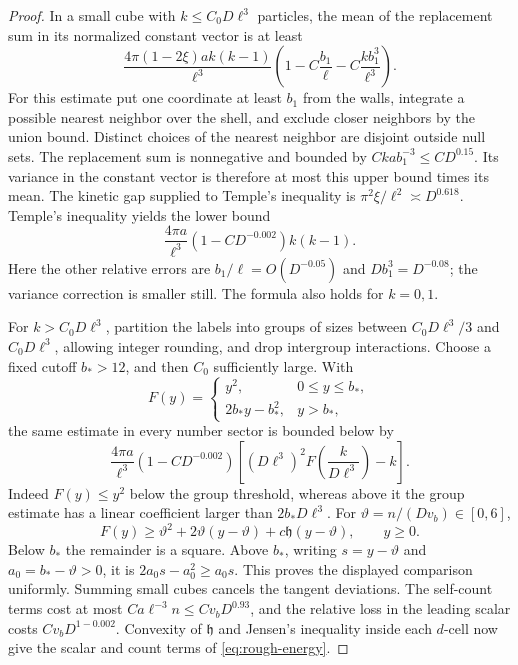 \begin{proof}
In a small cube with $k\le C_0D\ell^3$ particles, the mean of the
replacement sum in its normalized constant vector is at least
\[
 \frac{4\pi(1-2\xi)ak(k-1)}{\ell^3}
       \left(1-C\frac{b_1}{\ell}-C\frac{kb_1^3}{\ell^3}\right).
\]
For this estimate put one coordinate at least $b_1$ from the walls,
integrate a possible nearest neighbor over the shell, and exclude closer
neighbors by the union bound.  Distinct choices of the nearest neighbor
are disjoint outside null sets.  The replacement sum is nonnegative
and bounded by $Ckab_1^{-3}\le CD^{0.15}$.  Its variance in the constant
vector is therefore at most this upper bound times its mean.  The
kinetic gap supplied to Temple's inequality is
$\pi^2\xi/\ell^2\asymp D^{0.618}$.
Temple's inequality yields the lower bound
\[
 \frac{4\pi a}{\ell^3}(1-CD^{-0.002})k(k-1).
\]
Here the other relative errors are
$b_1/\ell=O(D^{-0.05})$ and $Db_1^3=D^{-0.08}$; the variance correction
is smaller still.  The formula also holds for $k=0,1$.

For $k>C_0D\ell^3$, partition the labels into groups of sizes between
$C_0D\ell^3/3$ and $C_0D\ell^3$, allowing integer rounding, and drop
intergroup interactions.  Choose a fixed cutoff $b_*>12$, and then $C_0$
sufficiently large.  With
\[
 F(y)=\begin{cases}y^2,&0\le y\le b_*,\\2b_*y-b_*^2,&y>b_*,\end{cases}
\]
the same estimate in every number sector is bounded below by
\[
 \frac{4\pi a}{\ell^3}(1-CD^{-0.002})
       \left[(D\ell^3)^2F\left(\frac{k}{D\ell^3}\right)-k\right].
\]
Indeed $F(y)\le y^2$ below the group threshold, whereas above it the
group estimate has a linear coefficient larger than $2b_*D\ell^3$.
For $\vartheta=n/(Dv_b)\in[0,6]$,
\[
 F(y)\ge\vartheta^2+2\vartheta(y-\vartheta)
                         +c\mathfrak h(y-\vartheta),\qquad y\ge0.
\]
Below $b_*$ the remainder is a square.  Above $b_*$, writing
$s=y-\vartheta$ and $a_0=b_*-\vartheta>0$, it is
$2a_0s-a_0^2\ge a_0s$.  This proves the displayed comparison uniformly.
Summing small cubes cancels the tangent deviations.  The self-count
terms cost at most $Ca\ell^{-3}n\le Cv_bD^{0.93}$, and the relative
loss in the leading scalar costs $Cv_bD^{1-0.002}$.
Convexity of $\mathfrak h$ and Jensen's inequality inside each $d$-cell
now give the scalar and count terms of \eqref{eq:rough-energy}.


\end{proof}
